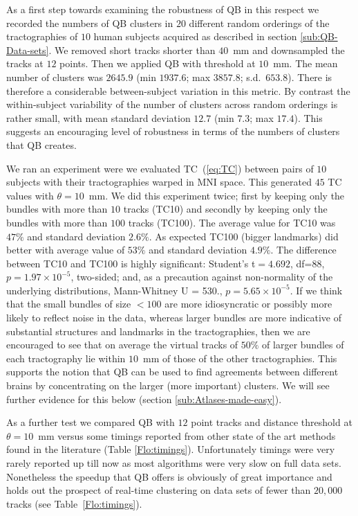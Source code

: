 \documentclass[preprint,authoryear,a4paper,10pt,onecolumn]{elsarticle}
\begin{document}
As a first step towards examining the robustness of QB in this respect
we recorded the numbers of QB clusters in $20$ different random
orderings of the tractographies of $10$ human subjects acquired as
described in section \ref{sub:QB-Data-sets}. We removed short tracks
shorter than $40$~mm and downsampled the tracks at $12$ points. Then we
applied QB with threshold at $10$~mm. The mean number of clusters was
$2645.9$ (min $1937.6$; max $3857.8$; s.d.~$653.8$). There is therefore
a considerable between-subject variation in this metric. By contrast the
within-subject variability of the number of clusters across random
orderings is rather small, with mean standard deviation $12.7$ (min
$7.3$; max $17.4$). This suggests an encouraging level of robustness in
terms of the numbers of clusters that QB creates.

We ran an experiment were we evaluated TC~(\ref{eq:TC}) between pairs of
$10$ subjects with their tractographies warped in MNI space. This
generated $45$ TC values with $\theta=$$10$~mm. We did
this experiment twice; first by keeping only the bundles with more than
$10$ tracks (TC10) and secondly by keeping only the bundles with more
than $100$ tracks (TC100). The average value for TC10 was $47\%$ and
standard deviation $2.6\%$. As expected TC100 (bigger landmarks) did
better with average value of $53\%$ and standard deviation $4.9\%$. The
difference between TC10 and TC100 is highly significant: Student's
t$=4.692$, df=88, $p=1.97\times10^{-5}$, two-sided; and, as a precaution
against non-normality of the underlying distributions, Mann-Whitney U =
530., $p=5.65\times10^{-5}$. If we think that the small bundles of size
$<100$ are more idiosyncratic or possibly more likely to reflect noise
in the data, whereas larger bundles are more indicative of substantial
structures and landmarks in the tractographies, then we are encouraged
to see that on average the virtual tracks of $50\%$ of larger bundles of
each tractography lie within $10$~mm of those of the other
tractographies. This supports the notion that QB can be used to find
agreements between different brains by concentrating on the larger (more
important) clusters. We will see further evidence for this below
(section \ref{sub:Atlases-made-easy}).

As a further test we compared QB with $12$ point tracks and distance
threshold at $\theta=10$~mm versus some timings reported from other
state of the art methods found in the literature (Table
\ref{Flo:timings}). Unfortunately timings were very rarely reported up
till now as most algorithms were very slow on full data
sets. Nonetheless the speedup that QB offers is obviously of great
importance and holds out the prospect of real-time clustering on data
sets of fewer than $20,000$ tracks (see Table~\ref{Flo:timings}).
\end{document}
